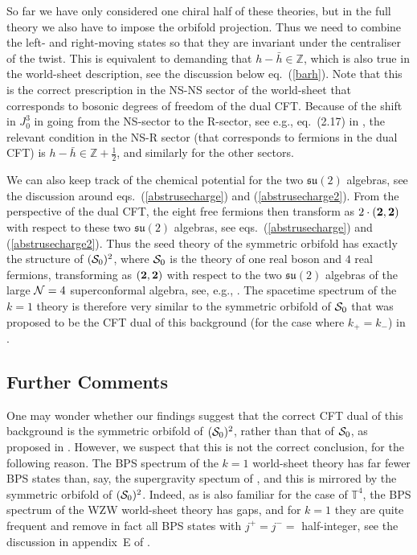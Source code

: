 \documentclass[12pt,a4paper]{article}
\begin{document}
So far we have only considered one chiral half of these theories, but in the full theory we also have to impose the orbifold projection. Thus we need to combine the left- and right-moving states so that they are invariant under the centraliser of the twist. This is equivalent to demanding that $h-\bar{h}\in\mathbb{Z}$, which is also true in the world-sheet description, see the discussion below eq.~(\ref{barh}). Note that this is the correct prescription in the NS-NS sector of the world-sheet that corresponds to bosonic degrees of freedom of the dual CFT. Because of the shift in $J^3_0$ in going from the NS-sector to the R-sector, see e.g., eq.~(2.17) in \cite{Ferreira:2017pgt}, the relevant condition in the NS-R sector (that corresponds to fermions in the dual CFT) is $h-\bar{h}\in\mathbb{Z}+\frac{1}{2}$, and similarly for the other sectors.

We can also keep track of the chemical potential for the two $\mathfrak{su}(2)$ algebras, see the discussion around eqs.~(\ref{abstrusecharge}) and (\ref{abstrusecharge2}). From the perspective of the dual CFT, the eight free fermions then transform as $2 \cdot ({\bf 2},{\bf 2})$ with respect to these two $\mathfrak{su}(2)$ algebras, see eqs.~(\ref{abstrusecharge}) and (\ref{abstrusecharge2}). Thus the seed theory of the symmetric orbifold has exactly the structure of $({\cal S}_0)^2$, where ${\cal S}_0$ is the theory of one real boson and $4$ real fermions, transforming as $({\bf 2},{\bf 2})$ with respect to the two $\mathfrak{su}(2)$ algebras of the large ${\cal N}=4$ superconformal algebra, see, e.g., \cite{Gukov:2004ym}. The spacetime spectrum of the $k=1$ theory is therefore very similar to the symmetric orbifold of ${\cal S}_0$ that was proposed to be the CFT dual of this background (for the case where $k_+=k_-$) in \cite{Eberhardt:2017pty}. 


\subsection{Further Comments}

One may wonder whether our findings suggest that the correct CFT dual of this background is the symmetric orbifold of $({\cal S}_0)^2$, rather than that of ${\cal S}_0$, as proposed in \cite{Eberhardt:2017pty}. However, we suspect that this is not the correct conclusion, for the following reason. The BPS spectrum of the $k=1$ world-sheet theory has far fewer BPS states than, say, the supergravity spectum of \cite{Eberhardt:2017fsi}, and this is mirrored by the symmetric orbifold of $({\cal S}_0)^2$. 
 Indeed, as is also familiar for the case of $\mathbb{T}^4$, the BPS spectrum of the WZW world-sheet theory has gaps, and for $k=1$ they are quite frequent and remove in fact  all BPS states with $j^+=j^- =$ half-integer, see the discussion in appendix~E of \cite{Eberhardt:2017pty}. 
 
\end{document}
